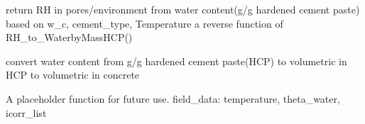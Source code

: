 \documentclass[letterpaper,10pt,english]{sphinxmanual}
\begin{document}

\begin{fulllineitems}
\label{\detokenize{corrosion:corrosion.WaterbyMassHCP_to_RH}}
\sphinxAtStartPar
return RH in pores/environment from water content(g/g hardened cement paste) based on w\_c, cement\_type, Temperature
a reverse function of RH\_to\_WaterbyMassHCP()

\end{fulllineitems}


\begin{fulllineitems}
\label{\detokenize{corrosion:corrosion.WaterbyMassHCP_to_theta_water}}
\sphinxAtStartPar
convert water content from g/g hardened cement paste(HCP)
to volumetric in HCP to volumetric in concrete

\end{fulllineitems}


\begin{fulllineitems}
\label{\detokenize{corrosion:corrosion.calibrate_f}}
\sphinxAtStartPar
A placeholder function for future use. field\_data: temperature, theta\_water, icorr\_list

\end{fulllineitems}

\end{document}
